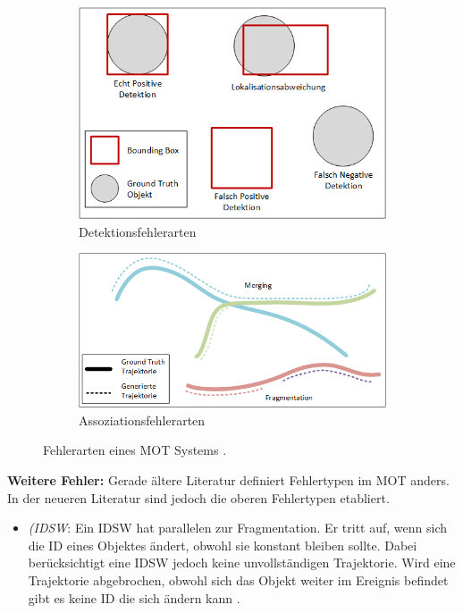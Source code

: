 \begin{figure}[htb]
 \centering
 \begin{subfigure}[htb]{0.7\textwidth}
     \centering
     \includegraphics[width=\textwidth]{img/Grafiken/MOT Fehlerarten Detektionen.png}
     \caption{Detektionsfehlerarten}
 \end{subfigure}
 \hfill
 \begin{subfigure}[htb]{0.7\textwidth}
     \centering
     \includegraphics[width=\textwidth]{img/Grafiken/MOT Fehlerarten Assoziation.png}
     \caption{Assoziationsfehlerarten}
 \end{subfigure}
    \caption{Fehlerarten eines \gls{MOT} Systems \cite{Leichter.2013}.}
    \label{fig:ErrorTypesMOT}
\end{figure}


\textbf{Weitere Fehler:}
Gerade ältere Literatur definiert Fehlertypen im \gls{MOT} anders. In der neueren Literatur sind jedoch die oberen Fehlertypen etabliert.

\begin{itemize}
    \item \textit{(\gls{IDSW}}: Ein \gls{IDSW} hat parallelen zur Fragmentation. Er tritt auf, wenn sich die \gls{ID} eines Objektes ändert, obwohl sie konstant bleiben sollte. Dabei berücksichtigt eine \gls{IDSW} jedoch keine unvollständigen \gls{Trajektorie}. Wird eine \gls{Trajektorie} abgebrochen, obwohl sich das Objekt weiter im \gls{Ereignis} befindet gibt es keine \acrshort{ID} die sich ändern kann \cite{CLEAR.2008, HOTA, IDF1}.
\end{itemize}

